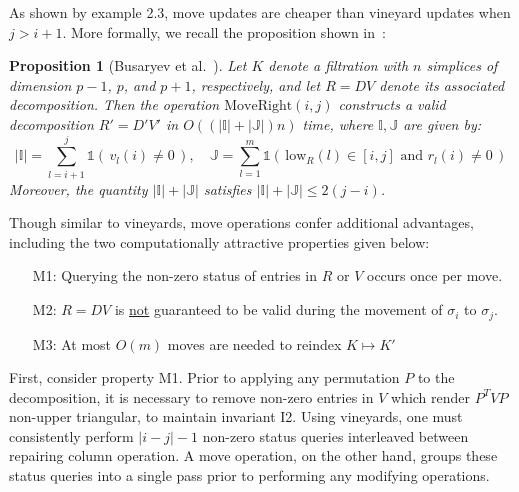\documentclass[sn-mathphys]{sn-jnl}
\newtheorem{proposition}{Proposition}
\newtheorem{remark}{Remark}
\begin{document}

As shown by example 2.3, move updates are cheaper than vineyard updates when $j > i+1$. More formally, we recall the proposition shown in~\cite{busaryev2010tracking}: 
\begin{proposition}[Busaryev et al.~\cite{busaryev2010tracking}]\label{prop:move_st}
	Let $K$ denote a filtration with $n$ simplices of dimension $p-1$, $p$, and $p+1$, respectively, and let $R = DV$ denote its associated decomposition. Then the operation $\mathrm{MoveRight}(i,j)$ constructs a valid decomposition $R' = D'V'$ in $O((\lvert \mathbb{I} \rvert + \lvert \mathbb{J} \rvert)n)$ time, where $\mathbb{I}, \mathbb{J}$ are given by:
	$$ \lvert \mathbb{I}\rvert = \sum\limits_{l=i+1}^j \mathds{1}\left(\, v_l(i) \neq 0 \, \right), \quad \mathbb{J} = \sum\limits_{l=1}^m \mathds{1}\left(\, \mathrm{low}_R(l) \in [i,j] \text{ and } r_l(i) \neq 0 \, \right)$$
	Moreover, the quantity $\lvert \mathbb{I} \rvert + \lvert \mathbb{J} \rvert$ satisfies $\lvert \mathbb{I} \rvert + \lvert \mathbb{J} \rvert \leq 2(j - i)$. 
\end{proposition}
\noindent Though similar to vineyards, move operations confer additional advantages, including the two computationally attractive properties given below:
\\	
 \begin{enumerate}[labelsep=5pt, topsep=0pt,itemsep=-0.25ex,parsep=1.2ex]
 	\item[M1:] Querying the non-zero status of entries in $R$ or $V$ occurs once per move.
 	\item[M2:] $R = D V$ is \underline{not} guaranteed to be valid during the movement of $\sigma_i $ to $ \sigma_j$.
 	\item[M3:] At most $O(m)$ moves are needed to reindex $K \mapsto K'$ 
 \end{enumerate} 
 \vspace*{1em}
First, consider property M1. Prior to applying any permutation $P$ to the decomposition, it is necessary to remove non-zero entries in $V$ which render $P^TVP$ non-upper triangular, to maintain invariant I2. 
Using vineyards, one must consistently perform $\lvert i - j \rvert - 1$ non-zero status queries interleaved between repairing column operation. A move operation, on the other hand, groups these status queries into a single pass prior to performing any modifying operations. 
\end{document}
